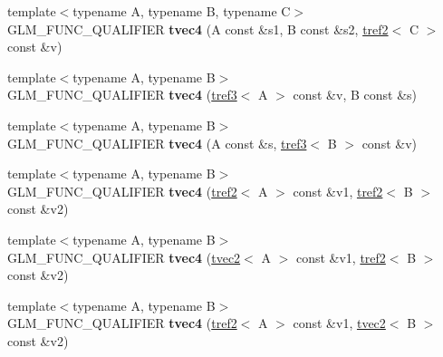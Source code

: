 \begin{DoxyCompactItemize}
\item 
\hypertarget{structglm_1_1detail_1_1tvec4_a5cb8465f83dc0c2001ebfce68b48d67d}{{\footnotesize template$<$typename A, typename B, typename C$>$ }\\G\-L\-M\-\_\-\-F\-U\-N\-C\-\_\-\-Q\-U\-A\-L\-I\-F\-I\-E\-R {\bfseries tvec4} (A const \&s1, B const \&s2, \hyperlink{structglm_1_1detail_1_1tref2}{tref2}$<$ C $>$ const \&v)}\label{structglm_1_1detail_1_1tvec4_a5cb8465f83dc0c2001ebfce68b48d67d}

\item 
\hypertarget{structglm_1_1detail_1_1tvec4_a9507aaa213a90d45ee326f5e4399714a}{{\footnotesize template$<$typename A, typename B$>$ }\\G\-L\-M\-\_\-\-F\-U\-N\-C\-\_\-\-Q\-U\-A\-L\-I\-F\-I\-E\-R {\bfseries tvec4} (\hyperlink{structglm_1_1detail_1_1tref3}{tref3}$<$ A $>$ const \&v, B const \&s)}\label{structglm_1_1detail_1_1tvec4_a9507aaa213a90d45ee326f5e4399714a}

\item 
\hypertarget{structglm_1_1detail_1_1tvec4_a39f14b264146c5861c046e83d778fe9c}{{\footnotesize template$<$typename A, typename B$>$ }\\G\-L\-M\-\_\-\-F\-U\-N\-C\-\_\-\-Q\-U\-A\-L\-I\-F\-I\-E\-R {\bfseries tvec4} (A const \&s, \hyperlink{structglm_1_1detail_1_1tref3}{tref3}$<$ B $>$ const \&v)}\label{structglm_1_1detail_1_1tvec4_a39f14b264146c5861c046e83d778fe9c}

\item 
\hypertarget{structglm_1_1detail_1_1tvec4_a9678b14b8b5b252523fea2d1c867a77b}{{\footnotesize template$<$typename A, typename B$>$ }\\G\-L\-M\-\_\-\-F\-U\-N\-C\-\_\-\-Q\-U\-A\-L\-I\-F\-I\-E\-R {\bfseries tvec4} (\hyperlink{structglm_1_1detail_1_1tref2}{tref2}$<$ A $>$ const \&v1, \hyperlink{structglm_1_1detail_1_1tref2}{tref2}$<$ B $>$ const \&v2)}\label{structglm_1_1detail_1_1tvec4_a9678b14b8b5b252523fea2d1c867a77b}

\item 
\hypertarget{structglm_1_1detail_1_1tvec4_a2cc5a3ca86e95f455ad3623a1bffa0b7}{{\footnotesize template$<$typename A, typename B$>$ }\\G\-L\-M\-\_\-\-F\-U\-N\-C\-\_\-\-Q\-U\-A\-L\-I\-F\-I\-E\-R {\bfseries tvec4} (\hyperlink{structglm_1_1detail_1_1tvec2}{tvec2}$<$ A $>$ const \&v1, \hyperlink{structglm_1_1detail_1_1tref2}{tref2}$<$ B $>$ const \&v2)}\label{structglm_1_1detail_1_1tvec4_a2cc5a3ca86e95f455ad3623a1bffa0b7}

\item 
\hypertarget{structglm_1_1detail_1_1tvec4_a48729e994bdd129af274bc5e53cdac7e}{{\footnotesize template$<$typename A, typename B$>$ }\\G\-L\-M\-\_\-\-F\-U\-N\-C\-\_\-\-Q\-U\-A\-L\-I\-F\-I\-E\-R {\bfseries tvec4} (\hyperlink{structglm_1_1detail_1_1tref2}{tref2}$<$ A $>$ const \&v1, \hyperlink{structglm_1_1detail_1_1tvec2}{tvec2}$<$ B $>$ const \&v2)}\label{structglm_1_1detail_1_1tvec4_a48729e994bdd129af274bc5e53cdac7e}


\end{DoxyCompactItemize}
